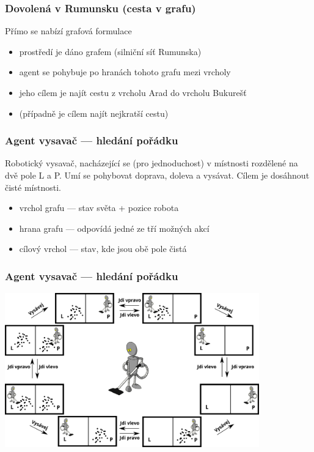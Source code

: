 \documentclass[red,professionalfont]{beamer}
\theoremstyle{definition}
\newcommand{\0}{\mbox{${\bf 0}$}}
\begin{document}
\begin{frame}\frametitle{Dovolená v Rumunsku (cesta v grafu)}
\begin{block}{}
\begin{center}
Přímo se nabízí grafová formulace
\end{center}
\end{block}
\pause

\begin{itemize}
 \item prostředí je dáno grafem (silniční síť Rumunska)\pause
 \item agent se pohybuje po hranách tohoto grafu mezi vrcholy\pause
 \item jeho cílem je najít cestu z vrcholu Arad do vrcholu Bukurešť\pause
 \item (případně je cílem najít \alert{nejkratší} cestu)
\end{itemize}

\end{frame}

\begin{frame}\frametitle{Agent vysavač --- hledání pořádku}
\begin{block}{}
 Robotický vysavač, nacházející se \pause(pro jednoduchost) \pause
 v místnosti rozdělené na dvě pole \alert{L} a \alert{P}.\pause{} Umí se pohybovat 
 \alert{doprava}\pause, \alert{doleva}\pause{} a \alert{vysávat}.\pause{} Cílem je dosáhnout čisté
 místnosti.
\end{block}\pause
\begin{itemize}
 \item vrchol grafu \pause  --- stav světa + pozice robota\pause
 \item hrana grafu \pause   --- odpovídá jedné ze tří možných akcí\pause
 \item cílový vrchol \pause --- stav, kde jsou obě pole čistá
\end{itemize}
\end{frame}

\begin{frame}\frametitle{Agent vysavač --- hledání pořádku}
\begin{center}
 \includegraphics[width=11cm]{vysavaci-graf.pdf}
\end{center} 
\end{frame}
\end{document}
